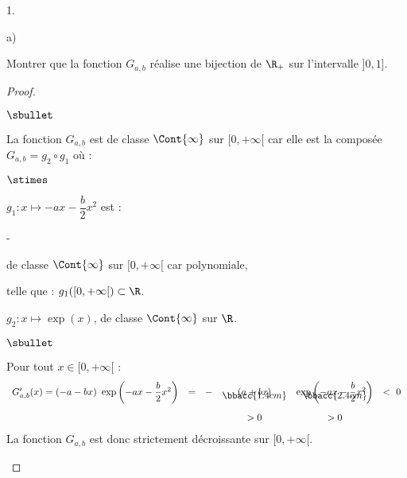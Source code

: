 \begin{noliste}{1.}
\item
  \begin{noliste}{a)}
    \setlength{\itemsep}{2mm}
  \item Montrer que la fonction $G_{a,b}$ réalise une bijection de
    $\R_+$ sur l'intervalle $]0,1]$.
    
    \begin{proof}~
      \begin{noliste}{$\sbullet$}
      \item La fonction $G_{a, b}$ est de classe $\Cont{\infty}$ sur $[0,
        +\infty[$ car elle est la composée $G_{a, b} = g_2 \circ g_1$ 
	où :
      \end{noliste}
      \begin{liste}{$\stimes$}
      \item $g_1 : x \mapsto -a x - \dfrac{b}{2} x^2$ est :
        \begin{noliste}{-}
        \item de classe $\Cont{\infty}$ sur $[0, +\infty[$ car
          polynomiale,
        \item telle que : $g_1([0, +\infty[) \subset \R$.
        \end{noliste}
      \item $g_2 : x \mapsto \exp(x)$, de classe $\Cont{\infty}$ sur $\R$.
      \end{liste}

      \begin{noliste}{$\sbullet$}
      \item Pour tout $x \in [0, +\infty[$ :
        \[
        \begin{array}{cccccc}
          G'_{a, b}(x) = (- a - b x) \ \exp\left( -a x - \dfrac{b}{2}
            x^2 \right) & = & - & (a+bx) & \exp\left( -a x - \dfrac{b}{2} x^2
          \right) & < \ 0 \\[-.5cm]
          & & & \bbacc{1.4cm} & \bbacc{2.4cm} & \\[.4cm]
          & & & > 0 & > 0 
        \end{array}
        \]
        La fonction $G_{a, b}$ est donc strictement décroissante sur
        $[0, +\infty[$.


\end{noliste}
\end{proof}
\end{noliste}
\end{noliste}
